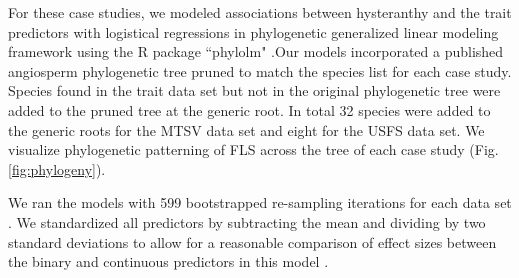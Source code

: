 \documentclass{article}\usepackage[]{graphicx}\usepackage[]{color}
\begin{document}
\noindent For these case studies, we modeled associations between hysteranthy and the trait predictors with logistical regressions in phylogenetic generalized linear modeling framework \citep{Ives2010} using the R package ``phylolm" \citep{Ho2014}.Our models incorporated a published angiosperm phylogenetic tree \citep{Zanne2013} pruned to match the species list for each case study. Species found in the trait data set but not in the original phylogenetic tree were added to the pruned tree at the generic root. In total 32 species were added to the generic roots for the MTSV data set and eight for the USFS data set. We visualize phylogenetic patterning of FLS across the tree of each case study (Fig. \ref{fig:phylogeny}).

\noindent We ran the models with 599 bootstrapped re-sampling iterations for each data set \citep{Wilcox2010}. We standardized all predictors by subtracting the mean and dividing by two standard deviations to allow for a reasonable comparison of effect sizes between the binary and continuous predictors in this model \citep{Gelman2007}. 
\end{document}

